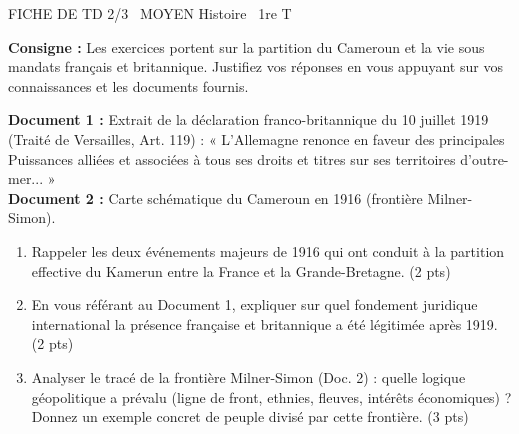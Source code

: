 \documentclass[11pt]{article}
\begin{document}
\begin{tcolorbox}[enhanced,colback=popink,colframe=popink,arc=10pt,boxrule=0pt,left=12pt,right=12pt,top=9pt,bottom=9pt]
{\color{white}\popxbold\small FICHE DE TD 2/3 \textbullet\ MOYEN \hfill Histoire \textbullet\ 1re T\par}
\end{tcolorbox}
\vspace{4pt}
\noindent \textbf{Consigne :} Les exercices portent sur la partition du Cameroun et la vie sous mandats français et britannique. Justifiez vos réponses en vous appuyant sur vos connaissances et les documents fournis.

\begin{exercice}
\textbf{Document 1 :} Extrait de la déclaration franco-britannique du 10 juillet 1919 (Traité de Versailles, Art. 119) : « L'Allemagne renonce en faveur des principales Puissances alliées et associées à tous ses droits et titres sur ses territoires d'outre-mer... » \\
\textbf{Document 2 :} Carte schématique du Cameroun en 1916 (frontière Milner-Simon).
\begin{enumerate}
    \item Rappeler les deux événements majeurs de 1916 qui ont conduit à la partition effective du Kamerun entre la France et la Grande-Bretagne. (2 pts)
    \item En vous référant au Document 1, expliquer sur quel fondement juridique international la présence française et britannique a été légitimée après 1919. (2 pts)
    \item Analyser le tracé de la frontière Milner-Simon (Doc. 2) : quelle logique géopolitique a prévalu (ligne de front, ethnies, fleuves, intérêts économiques) ? Donnez un exemple concret de peuple divisé par cette frontière. (3 pts)
\end{enumerate}
\end{exercice}
\end{document}
